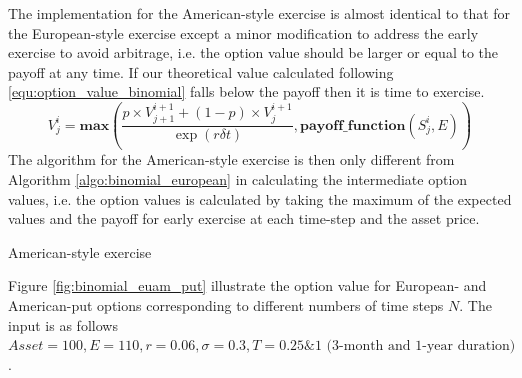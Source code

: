 The implementation for the American-style exercise is almost identical to that for the European-style exercise except a minor modification to address the early exercise to avoid arbitrage, i.e. the option value should be larger or equal to the payoff at any time. If our theoretical value calculated following \ref{equ:option_value_binomial} falls below the payoff then it is time to exercise. 
\begin{equation}
    V_j^i = \textbf{max} \left( \frac{p \times V_{j+1}^{i+1} + (1-p) \times V_{j}^{i+1}}{\exp(r \delta t)},
\textbf{payoff\_function} \left(S_j^i, E\right) \right)
\end{equation}
The algorithm for the American-style exercise is then only different from Algorithm \ref{algo:binomial_european} in calculating the intermediate option values, i.e. the option values is calculated by taking the maximum of the expected values and the payoff for early exercise at each time-step and the asset price.

\vspace{\baselineskip}
\begin{algorithm}[H]
\caption{American-style exercise}
\label{algo:binomial_american}   
\end{algorithm}
\vspace{\baselineskip}

Figure \ref{fig:binomial_euam_put} illustrate the option value for European- and American-put options corresponding to different numbers of time steps $N$. The input is as follows $Asset = 100, E = 110, r = 0.06, \sigma = 0.3, T = 0.25 \& 1 \text{ (3-month and 1-year duration)}$.

